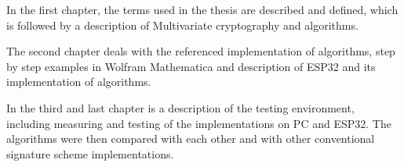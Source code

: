 \documentclass[thesis=M,english]{FITthesis}[2019/12/23]
\begin{document}
\bigskip
\noindent
In the first chapter, the terms used in the thesis are described and defined, which is followed by a description of Multivariate cryptography and algorithms.

\bigskip
\noindent
The second chapter deals with the referenced implementation of algorithms, step by step examples in Wolfram Mathematica and description of ESP32 and its implementation of algorithms.

\bigskip
\noindent
In the third and last chapter is a description of the testing environment, including measuring and testing of the implementations on PC and ESP32. The algorithms were then compared with each other and with other conventional signature scheme implementations.



\end{document}
